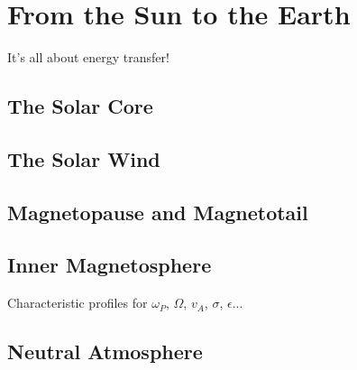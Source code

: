 
\chapter{From the Sun to the Earth}
\label{science_chapter}


It's all about energy transfer! 

\section{The Solar Core}

\section{The Solar Wind}

\section{Magnetopause and Magnetotail}

\section{Inner Magnetosphere}

Characteristic profiles for $\omega_P$, $\Omega$, $v_A$, $\sigma$, $\epsilon$...


\section{Neutral Atmosphere}


